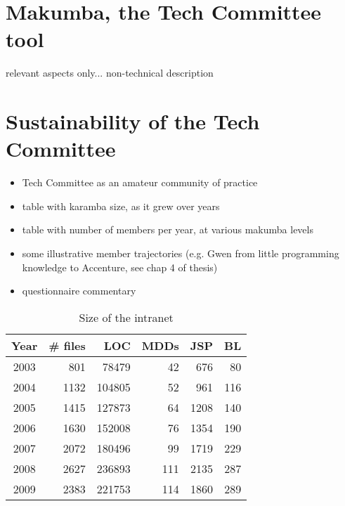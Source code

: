 \documentclass{acm_proc_article-sp}
\begin{document}
\section{Makumba, the Tech Committee tool}\label{sec:makumba}
relevant aspects only... non-technical description

\section{Sustainability of the Tech Committee}
\begin{itemize}
\item Tech Committee as an amateur community of practice
\item table with karamba size, as it grew over years
\item table with number of members per year, at various makumba levels
\item some illustrative member trajectories (e.g. Gwen from little programming knowledge to Accenture, see chap 4 of thesis)
\item questionnaire commentary
\end{itemize}

\begin{table}\label{tab:intranet-size}
	\centering
	\caption{Size of the intranet}
	\begin{tabular}{c|r|r|r|r|r}
		\hline
		\hline
		Year	& \# files	& LOC	& MDDs	& JSP	& BL	\\
		\hline
		\hline
		2003	& 801		& 78479 	& 42	& 676	& 80	\\
		\hline
		2004	& 1132		& 104805 	& 52	& 961	& 116	\\
		\hline
		2005	& 1415		& 127873 	& 64	& 1208	& 140	\\
		\hline
		2006	& 1630		& 152008 	& 76	& 1354	& 190	\\
		\hline
		2007	& 2072		& 180496 	& 99	& 1719	& 229	\\
		\hline
		2008	& 2627		& 236893 	& 111	& 2135	& 287	\\
		\hline
		2009	& 2383		& 221753 	& 114	& 1860	& 289	\\
		
		\hline
		\hline
	\end{tabular}
\end{table} 
\end{document}
